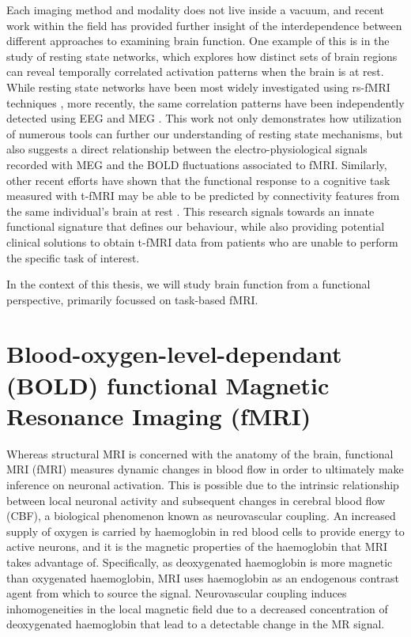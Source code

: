 Each imaging method and modality does not live inside a vacuum, and recent work within the field has provided further insight of the interdependence between different approaches to examining brain function. One example of this is in the study of resting state networks, which explores how distinct sets of brain regions can reveal temporally correlated activation patterns when the brain is at rest. While resting state networks have been most widely investigated using rs-fMRI techniques \citep[e.g.][]{Smith2009-dm, Lee2012-di, Moussa2012-bl}, more recently, the same correlation patterns have been independently detected using EEG and MEG \citep{Brookes2011-cj, Fomina2015-ha}. This work not only demonstrates how utilization of numerous tools can further our understanding of resting state mechanisms, but also suggests a direct relationship between the electro-physiological signals recorded with MEG and the BOLD fluctuations associated to fMRI. Similarly, other recent efforts have shown that the functional response to a cognitive task measured with t-fMRI may be able to be predicted by connectivity features from the same individual's brain at rest \citep{Parker_Jones2017-ld, Tavor2016-pd}. This research signals towards an innate functional signature that defines our behaviour, while also providing potential clinical solutions to obtain t-fMRI data from patients who are unable to perform the specific task of interest.  

In the context of this thesis, we will study brain function from a functional perspective, primarily focussed on task-based fMRI. 

\section{Blood-oxygen-level-dependant (BOLD) functional Magnetic Resonance Imaging (fMRI)}

Whereas structural MRI is concerned with the anatomy of the brain, functional MRI (fMRI) measures dynamic changes in blood flow in order to ultimately make inference on neuronal activation. This is possible due to the intrinsic relationship between local neuronal activity and subsequent changes in cerebral blood flow (CBF), a biological phenomenon known as neurovascular coupling. An increased supply of oxygen is carried by haemoglobin in red blood cells to provide energy to active neurons, and it is the magnetic properties of the haemoglobin that MRI takes advantage of. Specifically, as deoxygenated haemoglobin is more magnetic than oxygenated haemoglobin, MRI uses haemoglobin as an endogenous contrast agent from which to source the signal. Neurovascular coupling induces inhomogeneities in the local magnetic field due to a decreased concentration of deoxygenated haemoglobin that lead to a detectable change in the MR signal.

